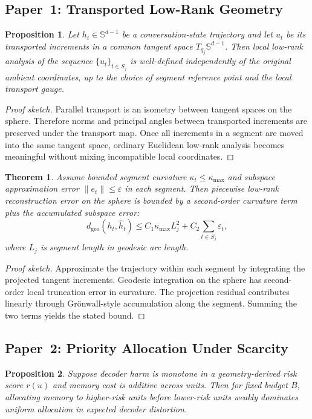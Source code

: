 \documentclass[conference]{IEEEtran}
\newtheorem{proposition}{Proposition}
\newtheorem{theorem}{Theorem}
\newcommand{\Sph}{\mathbb{S}}
\newcommand{\Geo}{d_{\mathrm{geo}}}
\begin{document}
\subsection{Paper~1: Transported Low-Rank Geometry}
\begin{proposition}
Let $h_t \in \Sph^{d-1}$ be a conversation-state trajectory and let $u_t$ be its transported increments in a common tangent space $T_{q_j}\Sph^{d-1}$. Then local low-rank analysis of the sequence $\{u_t\}_{t \in S_j}$ is well-defined independently of the original ambient coordinates, up to the choice of segment reference point and the local transport gauge.
\end{proposition}

\begin{proof}[Proof sketch]
Parallel transport is an isometry between tangent spaces on the sphere. Therefore norms and principal angles between transported increments are preserved under the transport map. Once all increments in a segment are moved into the same tangent space, ordinary Euclidean low-rank analysis becomes meaningful without mixing incompatible local coordinates.
\end{proof}

\begin{theorem}
Assume bounded segment curvature $\kappa_t \leq \kappa_{\max}$ and subspace approximation error $\lVert e_t \rVert \leq \varepsilon$ in each segment. Then piecewise low-rank reconstruction error on the sphere is bounded by a second-order curvature term plus the accumulated subspace error:
\begin{equation}
\Geo(h_t,\widehat{h}_t)
\leq
C_1 \kappa_{\max} L_j^2 + C_2 \sum_{t \in S_j} \varepsilon_t,
\end{equation}
where $L_j$ is segment length in geodesic arc length.
\end{theorem}

\begin{proof}[Proof sketch]
Approximate the trajectory within each segment by integrating the projected tangent increments. Geodesic integration on the sphere has second-order local truncation error in curvature. The projection residual contributes linearly through Gr\"onwall-style accumulation along the segment. Summing the two terms yields the stated bound.
\end{proof}

\subsection{Paper~2: Priority Allocation Under Scarcity}
\begin{proposition}
Suppose decoder harm is monotone in a geometry-derived risk score $r(u)$ and memory cost is additive across units. Then for fixed budget $B$, allocating memory to higher-risk units before lower-risk units weakly dominates uniform allocation in expected decoder distortion.
\end{proposition}
\end{document}
